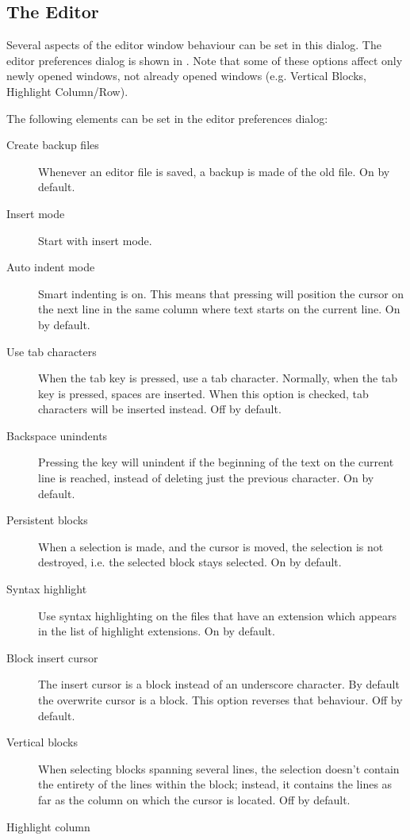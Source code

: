 \subsection{The Editor}
Several aspects of the editor window behaviour can be set in this dialog.
The editor preferences dialog is shown in . Note that
some of these options affect only newly opened windows, not already 
opened windows (e.g. Vertical Blocks, Highlight Column/Row).


The following elements can be set in the editor preferences dialog:
\begin{description}
\item[Create backup files]
Whenever an editor file is saved, a backup is made of the old file. On by
default.
\item[Insert mode] Start with insert mode.
\item[Auto indent mode]
Smart indenting is on. This means that pressing  will position the
cursor on the next line in the same column where text starts on the current
line. On by default.
\item[Use tab characters]
When the tab key is pressed, use a tab character. Normally, when the tab key
is pressed, spaces are inserted. When this option is checked, tab characters
will be inserted instead. Off by default.
\item[Backspace unindents]
Pressing the  key will unindent if the beginning of the text on
the current line is reached, instead of deleting just the previous
character. On by default.
\item[Persistent blocks]
When a selection is made, and the cursor is moved, the selection is not
destroyed, i.e. the selected block stays selected. On by default.
\item[Syntax highlight]
Use syntax highlighting on the files that have an extension which appears in
the list of highlight extensions. On by default.
\item[Block insert cursor]
The insert cursor is a block instead of an underscore character. By default
the overwrite cursor is a block. This option reverses that behaviour. Off by
default.
\item[Vertical blocks]
When selecting blocks spanning several lines, the selection doesn't 
contain the entirety of the lines within the block; instead, it 
contains the lines as far as the column on which the cursor is located.
Off by default.
\item[Highlight column]

\end{description}
